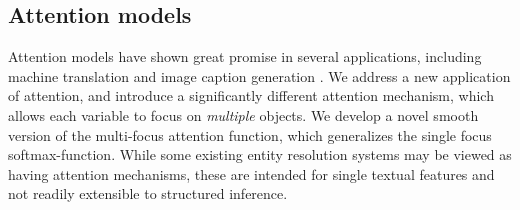 

\subsection{Attention models}

Attention models have shown great promise in several applications,
including machine translation \cite{bahdanau2014neural} and image
caption generation \cite{xu2015show}.  We address a new application of
attention, and introduce a significantly different attention
mechanism, which allows each variable to focus on \emph{multiple}
objects.  We develop a novel smooth version of the multi-focus
attention function, which generalizes the single focus
softmax-function.  While some existing entity resolution systems
\cite{Jin:2014,Lazic2015} may be viewed as having attention
mechanisms, these are intended for single textual features and not
readily extensible to structured inference.




